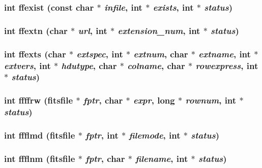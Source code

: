 \subsubsection{\setlength{\rightskip}{0pt plus 5cm}int ffexist (const char $\ast$ {\em infile}, int $\ast$ {\em exists}, int $\ast$ {\em status})}\label{fitsio_8h_a43845de368eac56f4640bb78d54fe12}


\subsubsection{\setlength{\rightskip}{0pt plus 5cm}int ffextn (char $\ast$ {\em url}, int $\ast$ {\em extension\_\-num}, int $\ast$ {\em status})}\label{fitsio_8h_9dcef60f99afddb050fbcd03fa2c97d9}


\subsubsection{\setlength{\rightskip}{0pt plus 5cm}int ffexts (char $\ast$ {\em extspec}, int $\ast$ {\em extnum}, char $\ast$ {\em extname}, int $\ast$ {\em extvers}, int $\ast$ {\em hdutype}, char $\ast$ {\em colname}, char $\ast$ {\em rowexpress}, int $\ast$ {\em status})}\label{fitsio_8h_17f7be49ef6df7e06048b3c9a23d4fd4}


\subsubsection{\setlength{\rightskip}{0pt plus 5cm}int ffffrw (\bf{fitsfile} $\ast$ {\em fptr}, char $\ast$ {\em expr}, long $\ast$ {\em rownum}, int $\ast$ {\em status})}\label{fitsio_8h_7e15c97abea56f20a86aa02d71fe80a2}


\subsubsection{\setlength{\rightskip}{0pt plus 5cm}int ffflmd (\bf{fitsfile} $\ast$ {\em fptr}, int $\ast$ {\em filemode}, int $\ast$ {\em status})}\label{fitsio_8h_b40add552ca38d7ad3adcaa46ed38eb4}


\subsubsection{\setlength{\rightskip}{0pt plus 5cm}int ffflnm (\bf{fitsfile} $\ast$ {\em fptr}, char $\ast$ {\em filename}, int $\ast$ {\em status})}\label{fitsio_8h_24ea04fea8050162c7c98d944d4f4a5d}



